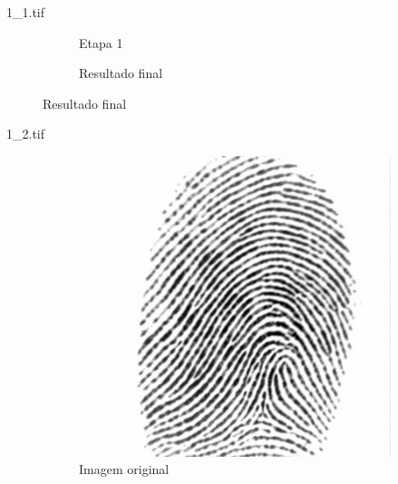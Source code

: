 \documentclass{beamer}
\begin{document}
\begin{frame}{1\_1.tif}
\begin{figure}
\begin{subfigure}[!ht]{0.32\textwidth}
                \caption{Etapa 1}
            \end{subfigure}
            \begin{subfigure}[!ht]{0.32\textwidth}
                \caption{Resultado final}
            \end{subfigure}
        \end{figure}
    \end{frame}

    \begin{frame}{1\_2.tif}
        \begin{figure}
            \centering
            \begin{subfigure}[!ht]{0.32\textwidth}
                \includegraphics[width=\columnwidth]{Fingerprints/1_2.jpg}
                \caption{Imagem original}
            \end{subfigure}
            \begin{subfigure}[!ht]{0.32\textwidth}

\end{subfigure}
\end{figure}
\end{frame}
\end{document}
